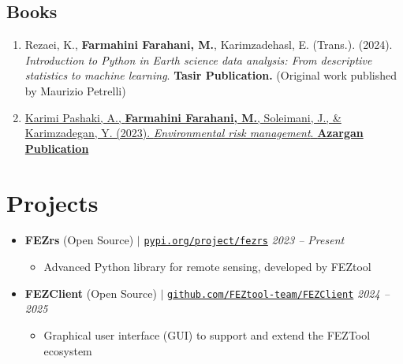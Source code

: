 \documentclass[letterpaper,11pt]{article}
\begin{document}
\begin{justify}
		\subsection*{Books}
		\begin{enumerate}[label=\arabic*.,left=0pt,topsep=7.5pt,partopsep=0pt,itemsep=3.5pt,parsep=0pt]
			\item Rezaei, K., \textbf{Farmahini Farahani, M.}, Karimzadehasl, E. (Trans.). (2024). \textit{Introduction to Python in Earth science data analysis: From descriptive statistics to machine learning}. \textbf{Tasir Publication.} (Original work published by Maurizio Petrelli)
			\item \href{https://www.researchgate.net/publication/374919527_Environmental_Risk_Management}{Karimi Pashaki, A., \textbf{Farmahini Farahani, M.}, Soleimani, J., \& Karimzadegan, Y. (2023). \textit{Environmental risk management}. \textbf{Azargan Publication}} 
		\end{enumerate}
	\end{justify}
\vspace{-1.8em}
	
	\section{Projects}
	
	\begin{itemize}[left=0pt, label={}, topsep=7.5pt, partopsep=0pt, itemsep=6pt, parsep=0pt]
		\item \textbf{FEZrs} (Open Source) $|$ \normalfont\href{https://pypi.org/project/fezrs/}{\texttt{pypi.org/project/fezrs}} \hfill \textit{2023 – Present}
		\begin{itemize}[left=15pt, label=\textbullet, topsep=4pt, partopsep=0pt, itemsep=3pt, parsep=0pt]
			\item Advanced Python library for remote sensing, developed by FEZtool
		\end{itemize}
	
	\end{itemize}
	\begin{itemize}[left=0pt, label={}, topsep=7.5pt, partopsep=0pt, itemsep=6pt, parsep=0pt]
	\item \textbf{FEZClient} (Open Source) $|$ \normalfont\href{https://github.com/FEZtool-team/FEZClient}{\texttt{github.com/FEZtool-team/FEZClient}} \hfill \textit{2024 -- 2025}
	\begin{itemize}[left=15pt, label=\textbullet, topsep=4pt, partopsep=0pt, itemsep=3pt, parsep=0pt]
		\item Graphical user interface (GUI) to support and extend the FEZTool ecosystem
		
	\end{itemize}
\end{itemize}
\end{document}

